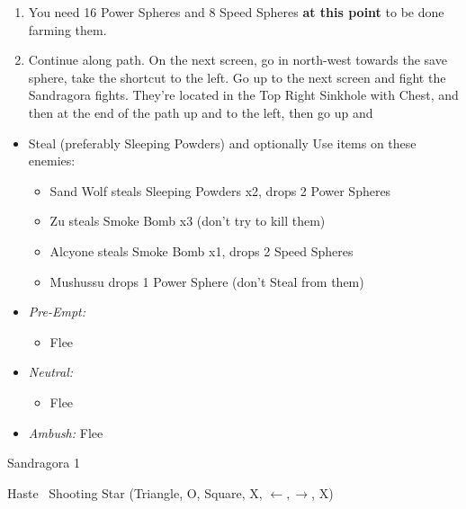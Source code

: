 \begin{enumerate}[resume]
	\item You need 16 Power Spheres and 8 Speed Spheres \textbf{at this point} to be done farming them.
	\item Continue along path. On the next screen, go in north-west towards the save sphere, take the shortcut to the left. Go up to the next screen and fight the Sandragora fights. They're located in the Top Right Sinkhole with Chest, and then at the end of the path up and to the left, then go up and \sd
\end{enumerate}
\winvfill
\begin{encounters}
	\begin{itemize}
		\item Steal (preferably Sleeping Powders) and optionally Use items on these enemies:
		\begin{itemize}
			\item Sand Wolf steals Sleeping Powders x2, drops 2 Power Spheres
			\item Zu steals Smoke Bomb x3 (don't try to kill them)
			\item Alcyone steals Smoke Bomb x1, drops 2 Speed Spheres
			\item Mushussu drops 1 Power Sphere (don't Steal from them)
		\end{itemize}
		\item \textit{Pre-Empt:}
		      \begin{itemize}
			      \tidusf Defend
			      \rikkuf Steal or Use a Smoke Bomb/Silence Grenade/Sleeping Powder
			      \auronf Defend
			      \item Flee
		      \end{itemize}
		\item \textit{Neutral:}
		      \begin{itemize}
			      \switch{\tidus}{\kimahri}
			      \kimahrif Steal
				  \rikkuf Switch for \tidus\ or Use a Smoke Bomb/Silence Grenade/Sleeping Powder
			      \item Flee
		      \end{itemize}
		\item \textit{Ambush:} Flee
	\end{itemize}
\end{encounters}
\begin{battle}{Sandragora 1}
	\begin{itemize}
		\tidusf Haste \auron
		\auronf \od\ Shooting Star (Triangle, O, Square, X, $\leftarrow, \rightarrow$, X)
	\end{itemize}
\end{battle}
